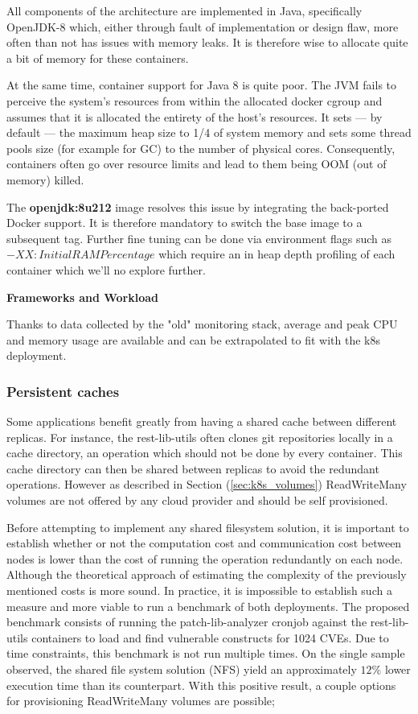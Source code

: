 \documentclass[11pt]{article}
\begin{document}
All components of the architecture are implemented in Java, specifically OpenJDK-8 which, either through fault of implementation or design flaw, more often than not has issues with memory leaks. It is therefore wise to allocate quite a bit of memory for these containers. 

At the same time, container support for Java 8 is quite poor. The JVM fails to perceive the system's resources from within the allocated docker cgroup and assumes that it is allocated the entirety of the host's resources.  It sets — by default — the maximum heap size to 1/4 of system memory and sets some thread pools size (for example for GC) to the number of physical cores. Consequently, containers often go over resource limits and lead to them being OOM (out of memory) killed. 

The \textbf{openjdk:8u212} image resolves this issue by integrating the back-ported Docker support. It is therefore mandatory to switch the base image to a subsequent tag. Further fine tuning can be done via environment flags such as $-XX:InitialRAMPercentage$ which require an in heap depth profiling of each container which we'll no explore further. 

\textbf{Frameworks and Workload}

Thanks to data collected by the "old" monitoring stack, average and peak CPU and memory usage are available and can be extrapolated to fit with the k8s deployment. 

\subsubsection{Persistent caches}

\hspace{5mm} Some applications benefit greatly from having a shared cache between different replicas. For instance, the rest-lib-utils often clones git repositories locally in a cache directory, an operation which should not be done by every container. This cache directory can then be shared between replicas to avoid the redundant operations. However as described in Section (\ref{sec:k8s_volumes}) ReadWriteMany volumes are not offered by any cloud provider and should be self provisioned. 

Before attempting to implement any shared filesystem solution, it is important to establish whether or not the computation cost and communication cost between nodes is lower than the cost of running the operation redundantly on each node. Although the theoretical approach of estimating the complexity of the previously mentioned costs is more sound. In practice, it is impossible to establish such a measure and more viable to run a benchmark of both deployments. The proposed benchmark consists of running the patch-lib-analyzer cronjob against the rest-lib-utils containers to load and find vulnerable constructs for 1024 CVEs. Due to time constraints, this benchmark is not run multiple times. On the single sample observed, the shared file system solution (NFS) yield an approximately $12\%$ lower execution time than its counterpart. With this positive result, a couple options for provisioning ReadWriteMany volumes are possible;
\end{document}
